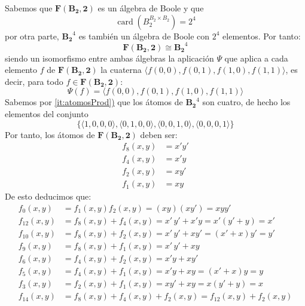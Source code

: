 \begin{solution}
  Sabemos que $\mathbf{F(B_{2},2)}$ es un álgebra de Boole y que
  \begin{equation*}
    \operatorname{card}(B_{2}^{B_{2}\times B_{2}})=2^{4}
  \end{equation*}
  por otra parte, $\mathbf{B_{2}}^{4}$ es también un álgebra de
  Boole con $2^{4}$ elementos. Por tanto:
  \begin{equation*}
    \mathbf{F(B_{2},2)}\cong\mathbf{B_{2}}^{4}
  \end{equation*}
  siendo un isomorfismo entre ambas álgebras la aplicación $\Psi$
  que aplica a cada elemento $f$ de $\mathbf{F(B_{2},2)}$ la
  cuaterna $\langle f(0,0), f(0,1), f(1,0), f(1,1)\rangle$, es
  decir, para todo $f\in\mathbf{F(B_{2},2)}$:
  \begin{equation*}
    \Psi(f)=\langle f(0,0), f(0,1), f(1,0), f(1,1)\rangle
  \end{equation*}
  Sabemos por \hyperref[it:atomosProd]{\ref*{it:atomosProd})} que
  los átomos de $\mathbf{B_{2}}^{4}$ son cuatro, de hecho los
  elementos del conjunto
  \begin{equation*}
    \{\langle 1,0,0,0\rangle,
    \langle 0,1,0,0\rangle,
    \langle 0,0,1,0\rangle,
    \langle 0,0,0,1\rangle\} 
  \end{equation*}
  Por tanto, los átomos de
  $\mathbf{F(B_{2},2)}$ deben ser:
  \begin{align*}
    f_{8}(x,y)&=x'y'\\
    f_{4}(x,y)&=x'y\\
    f_{2}(x,y)&=xy'\\
    f_{1}(x,y)&=xy
  \end{align*}
  De esto deducimos que:
  \begin{align*}
    f_{0}(x,y)&=f_{1}(x,y)f_{2}(x,y)=(xy)(xy')=xyy'\\
    f_{12}(x,y)&=f_{8}(x,y)+f_{4}(x,y)=x'\,y'+x'y
                 =x'(y'+y)=x'\\
    f_{10}(x,y)&=f_{8}(x,y)+f_{2}(x,y)=x'\,y'+xy'
                 =(x'+x)y'=y'\\
    f_{9}(x,y)&=f_{8}(x,y)+f_{1}(x,y)=x'\,y'+xy\\
    f_{6}(x,y)&=f_{4}(x,y)+f_{2}(x,y)=x'y+xy'\\
    f_{5}(x,y)&=f_{4}(x,y)+f_{1}(x,y)=x'y+xy=(x'+x)y=y\\
    f_{3}(x,y)&=f_{2}(x,y)+f_{1}(x,y)=xy'+xy=x(y'+y)=x\\
    f_{14}(x,y)&=f_{8}(x,y)+f_{4}(x,y)+f_{2}(x,y)=f_{12}(x,y)+f_{2}(x,y)

\end{align*}
\end{solution}
